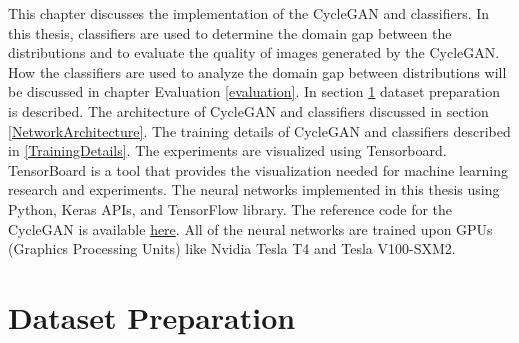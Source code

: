 \justifying
\setlength{\parskip}{1em}

This chapter discusses the implementation of the \ac{CycleGAN} and classifiers. In this thesis, classifiers are used to determine the domain gap between the distributions and to evaluate the quality of images generated by the \ac{CycleGAN}. How the classifiers are used to analyze the domain gap between distributions will be discussed in chapter Evaluation \ref{evaluation}. In section \ref{DatasetPreparation} dataset preparation is described. The architecture of \ac{CycleGAN} and classifiers discussed in section \ref{NetworkArchitecture}. The training details of \ac{CycleGAN} and classifiers described in \ref{TrainingDetails}. The experiments are visualized using Tensorboard\footnotemark. TensorBoard is a tool that provides the visualization needed for machine learning research and experiments. The neural networks implemented in this thesis using Python, Keras APIs, and TensorFlow library\cite{tensorflow2015-whitepaper}. The reference code for the \ac{CycleGAN} is available \href{https://keras.io/examples/generative/cyclegan/}{here}. All of the neural networks are trained upon GPUs (Graphics Processing Units) like Nvidia Tesla T4 and Tesla V100-SXM2.



\section{Dataset Preparation}\label{DatasetPreparation}

